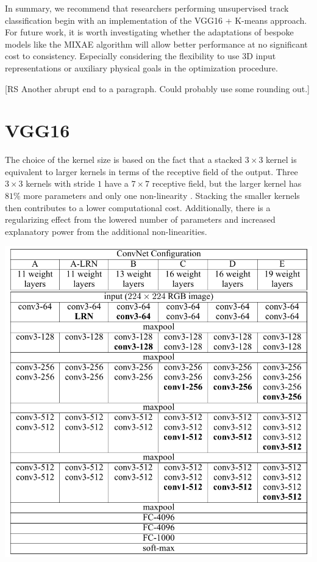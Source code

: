 \documentclass[review,number,sort&compress]{elsarticle}
\begin{document}
In summary, we recommend that researchers performing unsupervised track classification begin with an implementation of the VGG16 + K-means approach. For future work, it is worth investigating whether the adaptations of bespoke models like the MIXAE algorithm will allow better performance at no significant cost to consistency.  Especially considering the flexibility to use 3D input representations or auxiliary physical goals in the optimization procedure. 


{\color{orange}[RS Another abrupt end to a paragraph. Could probably use some rounding out.]} 

\appendix  
\section{VGG16}\label{app:vgg}
The choice of the kernel size is based on the fact that a stacked $3 \times 3$ kernel is equivalent to larger kernels in terms of the receptive field of the output. Three $3 \times 3$ kernels with stride $1$ have a $7 \times 7$ receptive field, but the larger kernel has $81\%$ more parameters and only one non-linearity \cite{Simonyan2014}. Stacking the smaller kernels then contributes to a lower computational cost. Additionally, there is a regularizing effect from the lowered number of parameters and increased explanatory power from the additional non-linearities.
\begin{table}
\caption[vgg architectures]{Showing the details of the VGG network architectures. Network D trained on the ImageNet \cite{Russakovsky2015} dataset the network known as  VGG16 and is what we use in this thesis.}\label{tab:vgg}
\includegraphics[width=\textwidth]{plots/vgg_architectures.png}
\end{table}
\end{document}
